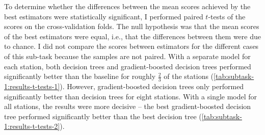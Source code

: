 \documentclass[11pt]{extarticle}
\begin{document}
To determine whether the differences between the mean scores achieved by the best
estimators were statistically significant, I performed paired $t$-tests of the scores
on the cross-validation folds.
The null hypothesis was that the mean scores of the best estimators were equal, i.e.,
that the differences between them were due to chance.
I did not compare the scores between estimators for the different cases of this
sub-task because the samples are not paired.
With a separate model for each station, both decision trees and gradient-boosted
decision trees performed significantly better than the baseline for roughly
$\frac{2}{3}$ of the stations (\cref{tab:subtask-1:results-t-tests-1}).
However, gradient-boosted decision trees only performed significantly better than
decision trees for eight stations.
With a single model for all stations, the results were more decisive -- the best
gradient-boosted decision tree performed significantly better than the best decision
tree (\cref{tab:subtask-1:results-t-tests-2}).
\end{document}
